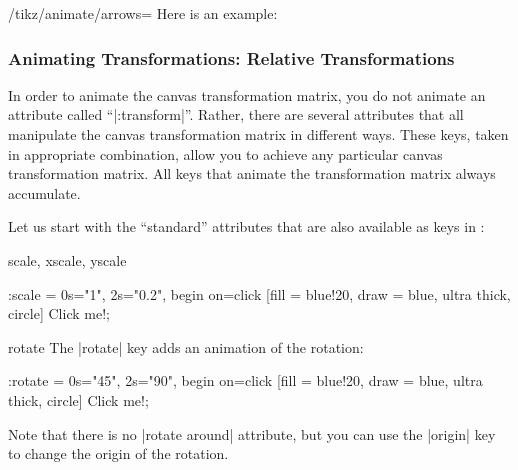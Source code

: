 \begin{key}{/tikz/animate/arrows=}
  Here is an example:

\begin{codeexample}[animation list={0.5,1,1.5,2},animation bb={(-0.1,-0.1) rectangle (1.1,1.1)}]
\end{codeexample}

\end{key}



\subsubsection{Animating Transformations: Relative Transformations}

In order to animate the canvas transformation matrix, you do not
animate an attribute called ``|:transform|''. Rather, there are
several attributes that all manipulate the canvas transformation
matrix in different ways. These keys, taken in appropriate
combination, allow you to achieve any particular canvas transformation
matrix. All keys that animate the transformation matrix always
accumulate.

Let us start with the ``standard'' attributes that are also available
as keys in \tikzname: 

\begin{tikzanimateattribute}{scale, xscale, yscale}
\begin{codeexample}[animation list={0.5,1,1.5,2}]
\tikz \node :scale = { 0s="1", 2s="0.2", begin on=click}
  [fill = blue!20, draw = blue, ultra thick, circle] {Click me!}; 
\end{codeexample}
\end{tikzanimateattribute}

\begin{tikzanimateattribute}{rotate}
  The |rotate| key adds an animation of the rotation:
\begin{codeexample}[animation list={0.5,1,1.5,2}]
\tikz \node :rotate = { 0s="45", 2s="90", begin on=click}
  [fill = blue!20, draw = blue, ultra thick, circle] {Click me!}; 
\end{codeexample}
  Note that there is no |rotate around| attribute, but you can use the
  |origin| key to change the origin of the rotation.
\end{tikzanimateattribute}


